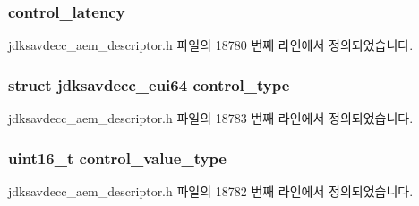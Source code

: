 \subsubsection[{\texorpdfstring{control\+\_\+latency}{control_latency}}]{ control\+\_\+latency}\hypertarget{structjdksavdecc__descriptor__control_ab2bd4639caaf9a8078b68368afbd63b6}{}\label{structjdksavdecc__descriptor__control_ab2bd4639caaf9a8078b68368afbd63b6}


jdksavdecc\+\_\+aem\+\_\+descriptor.\+h 파일의 18780 번째 라인에서 정의되었습니다.

\subsubsection[{\texorpdfstring{control\+\_\+type}{control_type}}]{\setlength{\rightskip}{0pt plus 5cm}struct {\bf jdksavdecc\+\_\+eui64} control\+\_\+type}\hypertarget{structjdksavdecc__descriptor__control_affec595f0ec2a4ae7a3cece71d05adcb}{}\label{structjdksavdecc__descriptor__control_affec595f0ec2a4ae7a3cece71d05adcb}


jdksavdecc\+\_\+aem\+\_\+descriptor.\+h 파일의 18783 번째 라인에서 정의되었습니다.

\subsubsection[{\texorpdfstring{control\+\_\+value\+\_\+type}{control_value_type}}]{\setlength{\rightskip}{0pt plus 5cm}uint16\+\_\+t control\+\_\+value\+\_\+type}\hypertarget{structjdksavdecc__descriptor__control_a62a5b88a920cc4d09508de6fc60d9a63}{}\label{structjdksavdecc__descriptor__control_a62a5b88a920cc4d09508de6fc60d9a63}


jdksavdecc\+\_\+aem\+\_\+descriptor.\+h 파일의 18782 번째 라인에서 정의되었습니다.

